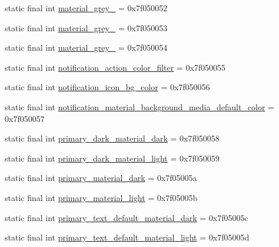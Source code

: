 \begin{DoxyCompactItemize}
static final int \mbox{\hyperlink{classandroid_1_1support_1_1design_1_1_r_1_1color_ad9a2b51d092cb75f6962ac361e97d011}{material\+\_\+grey\+\_}} = 0x7f050052
\item 
static final int \mbox{\hyperlink{classandroid_1_1support_1_1design_1_1_r_1_1color_a6044c07d5de49682f79a05b1f984f84f}{material\+\_\+grey\+\_}} = 0x7f050053
\item 
static final int \mbox{\hyperlink{classandroid_1_1support_1_1design_1_1_r_1_1color_af07ef2c90166a0345068e44048af4212}{material\+\_\+grey\+\_}} = 0x7f050054
\item 
static final int \mbox{\hyperlink{classandroid_1_1support_1_1design_1_1_r_1_1color_a1d5ddbcb3f92a7298d4a30ab8f30f6c2}{notification\+\_\+action\+\_\+color\+\_\+filter}} = 0x7f050055
\item 
static final int \mbox{\hyperlink{classandroid_1_1support_1_1design_1_1_r_1_1color_aecb2743a0e782ff961574645b5756456}{notification\+\_\+icon\+\_\+bg\+\_\+color}} = 0x7f050056
\item 
static final int \mbox{\hyperlink{classandroid_1_1support_1_1design_1_1_r_1_1color_a59a06155e6267bf6d4d30698d58b58f8}{notification\+\_\+material\+\_\+background\+\_\+media\+\_\+default\+\_\+color}} = 0x7f050057
\item 
static final int \mbox{\hyperlink{classandroid_1_1support_1_1design_1_1_r_1_1color_a7dc3cb3efd6d31479f735fe873f58748}{primary\+\_\+dark\+\_\+material\+\_\+dark}} = 0x7f050058
\item 
static final int \mbox{\hyperlink{classandroid_1_1support_1_1design_1_1_r_1_1color_a25d5d8ccf48a63bdcd173ed25e84d186}{primary\+\_\+dark\+\_\+material\+\_\+light}} = 0x7f050059
\item 
static final int \mbox{\hyperlink{classandroid_1_1support_1_1design_1_1_r_1_1color_a7af93f82b377f51a011497200729e857}{primary\+\_\+material\+\_\+dark}} = 0x7f05005a
\item 
static final int \mbox{\hyperlink{classandroid_1_1support_1_1design_1_1_r_1_1color_a20aa169940dc7ef70408191713f62b84}{primary\+\_\+material\+\_\+light}} = 0x7f05005b
\item 
static final int \mbox{\hyperlink{classandroid_1_1support_1_1design_1_1_r_1_1color_aca4a2383fca5f6ccb557cfe94ebba6c0}{primary\+\_\+text\+\_\+default\+\_\+material\+\_\+dark}} = 0x7f05005c
\item 
static final int \mbox{\hyperlink{classandroid_1_1support_1_1design_1_1_r_1_1color_a2d4f6d12973f5b51169658522eef0883}{primary\+\_\+text\+\_\+default\+\_\+material\+\_\+light}} = 0x7f05005d

\end{DoxyCompactItemize}
